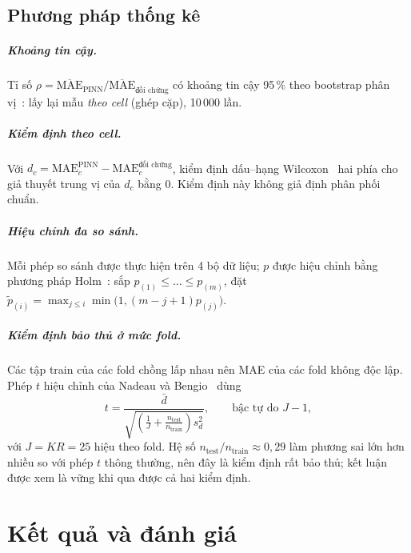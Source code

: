\documentclass[12pt,a4paper,oneside]{report}
\theoremstyle{plain}
\theoremstyle{definition}
\begin{document}
\section{Phương pháp thống kê}\label{sec:stats}

\paragraph{Khoảng tin cậy.} Tỉ số $\rho = \overline{\mathrm{MAE}}_\text{PINN}/\overline{\mathrm{MAE}}_\text{đối chứng}$
có khoảng tin cậy 95\,\% theo bootstrap phân vị~\cite{efron1993}: lấy lại mẫu \emph{theo cell} (ghép cặp),
10\,000 lần.

\paragraph{Kiểm định theo cell.} Với $d_c = \mathrm{MAE}_c^\text{PINN} - \mathrm{MAE}_c^\text{đối chứng}$,
kiểm định dấu--hạng Wilcoxon~\cite{wilcoxon1945} hai phía cho giả thuyết trung vị của $d_c$ bằng 0. Kiểm định này
không giả định phân phối chuẩn.

\paragraph{Hiệu chỉnh đa so sánh.} Mỗi phép so sánh được thực hiện trên 4 bộ dữ liệu; $p$ được hiệu chỉnh bằng
phương pháp Holm~\cite{holm1979}: sắp $p_{(1)} \le \dots \le p_{(m)}$, đặt
$\tilde p_{(i)} = \max_{j \le i}\min\big(1, (m - j + 1)p_{(j)}\big)$.

\paragraph{Kiểm định bảo thủ ở mức fold.} Các tập train của các fold chồng lấp nhau nên MAE của các fold không
độc lập. Phép $t$ hiệu chỉnh của Nadeau và Bengio~\cite{nadeau2003,bouckaert2004} dùng
\begin{equation}
t = \frac{\bar d}{\sqrt{\left(\frac{1}{J} + \frac{n_\text{test}}{n_\text{train}}\right)s_d^2}}, \qquad
\text{bậc tự do } J - 1,
\end{equation}
với $J = KR = 25$ hiệu theo fold. Hệ số $n_\text{test}/n_\text{train} \approx 0{,}29$ làm phương sai lớn hơn nhiều
so với phép $t$ thông thường, nên đây là kiểm định rất bảo thủ; kết luận được xem là vững khi qua được cả hai
kiểm định.



\chapter{Kết quả và đánh giá}\label{ch:ketqua}
\end{document}
